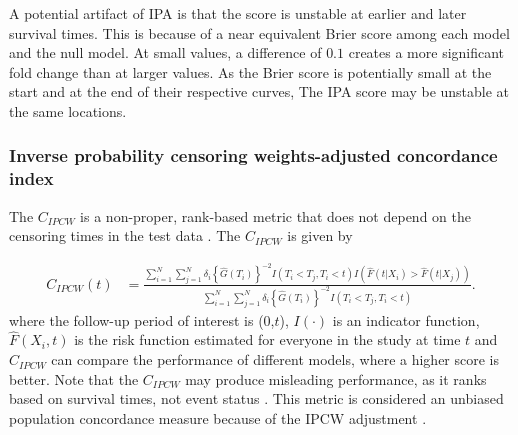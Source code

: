 \documentclass[AMA,STIX1COL,]{WileyNJD-v2}
\begin{document}
A potential artifact of IPA is that the score is unstable at earlier and
later survival times. This is because of a near equivalent Brier score
among each model and the null model. At small values, a difference of
\(0.1\) creates a more significant fold change than at larger values. As
the Brier score is potentially small at the start and at the end of
their respective curves, The IPA score may be unstable at the same
locations.

\hypertarget{inverse-probability-censoring-weights-adjusted-concordance-index}{%
\subsubsection{Inverse probability censoring weights-adjusted
concordance
index}\label{inverse-probability-censoring-weights-adjusted-concordance-index}}

The \(C_{IPCW}\) is a non-proper, rank-based metric that does not depend
on the censoring times in the test data \citep{uno2011}. The
\(C_{IPCW}\) is given by

\begin{align} \label{eq:cidx}
C_{IPCW}(t) &= \frac{\sum^{N}_{i=1}\sum^{N}_{j=1}\delta_{i}\left\{\widehat{G}(T_{i})\right\}^{-2} I(T_{i}<T_{j},T_{i}<t) I\left(\widehat{F}(t|X_{i})>\widehat{F}(t|X_{j})\right)}{\sum^{N}_{i=1}\sum^{N}_{j=1}\delta_{i}\left\{\widehat{G}(T_{i})\right\}^{-2} I(T_{i}<T_{j},T_{i}<t)}.
\end{align} where the follow-up period of interest is (0,\(t\)),
\(I(\cdot)\) is an indicator function, \(\widehat{F}(X_{i},t)\) is the
risk function estimated for everyone in the study at time \(t\) and
\(C_{IPCW}\) can compare the performance of different models, where a
higher score is better. Note that the \(C_{IPCW}\) may produce
misleading performance, as it ranks based on survival times, not event
status \citep{cindexfails2019}. This metric is considered an unbiased
population concordance measure because of the IPCW adjustment
\citep{uno2011}.
\end{document}
